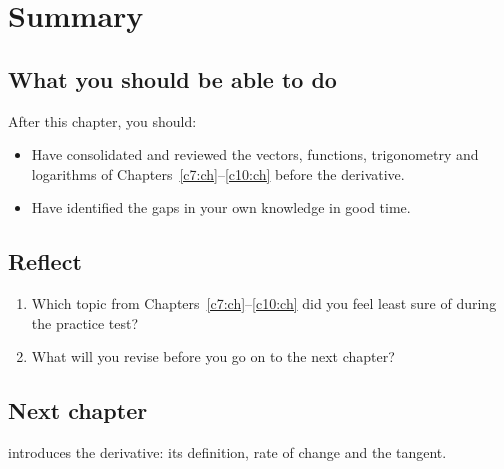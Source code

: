
\section{Summary}
\label{c11:sec:sammanfattning}

\subsection*{What you should be able to do}
After this chapter, you should:
\begin{itemize}
  \item Have consolidated and reviewed the vectors, functions, trigonometry and logarithms of
    Chapters~\ref{c7:ch}--\ref{c10:ch} before the derivative.
  \item Have identified the gaps in your own knowledge in good time.
\end{itemize}

\subsection*{Reflect}
\begin{enumerate}
  \item Which topic from Chapters~\ref{c7:ch}--\ref{c10:ch} did you feel least sure of during the
    practice test?
  \item What will you revise before you go on to the next chapter?
\end{enumerate}

\subsection*{Next chapter}
 introduces the derivative: its definition, rate of change and the tangent.
